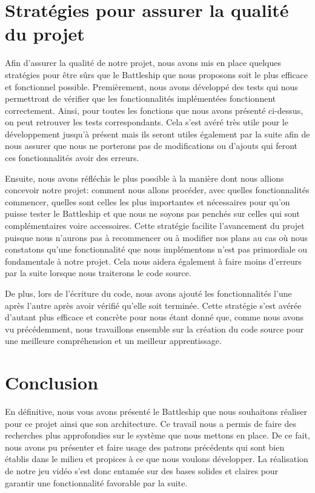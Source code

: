 \documentclass[12pt]{article}
\begin{document}
\section{Stratégies pour assurer la qualité du projet}

Afin d'assurer la qualité de notre projet, nous avons mis en place quelques stratégies pour être sûrs que le Battleship que nous proposons soit le plus efficace et fonctionnel possible. Premièrement, nous avons développé des tests qui nous permettront de vérifier que les fonctionnalités implémentées fonctionnent correctement. Ainsi, pour toutes les fonctions que nous avons présenté ci-dessus, on peut retrouver les tests correspondants. Cela s'est avéré très utile pour le développement jusqu'à présent mais ils seront utiles également par la suite afin de nous assurer que nous ne porterons pas de modifications ou d'ajouts qui feront ces fonctionnalités avoir des erreurs.

Ensuite, nous avons réfléchis le plus possible à la manière dont nous allions concevoir notre projet: comment nous allons procéder, avec quelles fonctionnalités commencer, quelles sont celles les plus importantes et nécessaires pour qu'on puisse tester le Battleship et que nous ne soyons pas penchés sur celles qui sont complémentaires voire accessoires. Cette stratégie facilite l'avancement du projet puisque nous n'aurons pas à recommencer ou à modifier nos plans au cas où nous constatons qu'une fonctionnalité que nous implémentons n'est pas primordiale ou fondamentale à notre projet. Cela nous aidera également à faire moins d'erreurs par la suite lorsque nous traiterons le code source.

De plus, lors de l'écriture du code, nous avons ajouté les fonctionnalités l'une après l'autre après avoir vérifié qu'elle soit terminée. Cette stratégie s'est avérée d'autant plus efficace et concrète pour nous étant donné que, comme nous avons vu précédemment, nous travaillons ensemble sur la création du code source pour une meilleure compréhension et un meilleur apprentissage.

\section{Conclusion}

En définitive, nous vous avons présenté le Battleship que nous souhaitons réaliser pour ce projet ainsi que son architecture. Ce travail nous a permis de faire des recherches plus approfondies sur le système que nous mettons en place. De ce fait, nous avons pu présenter et faire usage des patrons précédents qui sont bien établis dans le milieu et propices à ce que nous voulons développer. La réalisation de notre jeu vidéo s'est donc entamée sur des bases solides et claires pour garantir une fonctionnalité favorable par la suite.

\newpage


\end{document}
